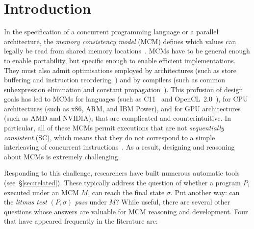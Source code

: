 \section{Introduction}
\label{sec:intro}
\label{sec:intro:context}

In the specification of a concurrent programming language or a
parallel architecture, the \emph{memory consistency model} (MCM)
defines which values can legally be read from shared memory
locations~\cite{adve+96}. MCMs have to be general enough to enable
portability, but specific enough to enable efficient
implementations. They must also admit optimisations employed by architectures (such as
store buffering and instruction reordering~\cite{hennessy+12}) and by
compilers (such as common subexpression elimination and constant
propagation~\cite{aho+06}). This profusion of design goals has led to MCMs for
languages (such as C11~\cite{c11} and OpenCL~2.0~\cite{opencl20}), for
CPU architectures (such as x86, ARM, and IBM Power), and for GPU
architectures (such as AMD and NVIDIA), that are complicated and
counterintuitive. In particular, all of these MCMs permit executions
that are not \emph{sequentially consistent} (SC), which means that
they do not correspond to a simple interleaving of concurrent
instructions~\cite{lamport79}. As a result, designing and reasoning
about MCMs is extremely challenging.

Responding to this challenge, researchers have built numerous
automatic tools (see~\S\ref{sec:related}). These typically address the
question of whether a program $P$, executed under an MCM $M$, can
reach the final state $\sigma$. Put another way: can the \emph{litmus
test} $(P,\sigma)$ \emph{pass} under $M$? While useful, there are
several other questions whose answers are valuable for MCM reasoning
and development. Four that have appeared frequently in the literature
are:

